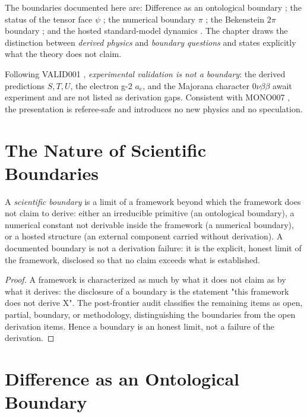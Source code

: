 The boundaries documented here are: Difference as an ontological boundary \cite{c13:QG278}; the
status of the tensor face $\psi$ \cite{c13:QG286}; the numerical boundary $\pi$ \cite{c13:QG291};
the Bekenstein $2\pi$ boundary \cite{c13:QG185,c13:QG196}; and the hosted standard-model dynamics
\cite{c13:QG242,c13:QG245}. The chapter draws the distinction between \emph{derived physics} and
\emph{boundary questions} \cite{c13:QG299} and states explicitly what the theory does not claim.

Following VALID001 \cite{c13:VALID001}, \emph{experimental validation is not a boundary}: the
derived predictions $S,T,U$, the electron g-2 $a_e$, and the Majorana character $0\nu\beta\beta$
await experiment and are not listed as derivation gaps. Consistent with MONO007 \cite{c13:MONO007},
the presentation is referee-safe and introduces no new physics and no speculation.

\section{The Nature of Scientific Boundaries}
\label{c13:sec:nature-boundaries}

\begin{lemma}
\label{c13:lem:boundaries-not-failures}
A \emph{scientific boundary} is a limit of a framework beyond which the framework does not
claim to derive: either an irreducible primitive (an ontological boundary), a numerical
constant not derivable inside the framework (a numerical boundary), or a hosted structure
(an external component carried without derivation). A documented boundary is not a
derivation failure: it is the explicit, honest limit of the framework, disclosed so that no
claim exceeds what is established.
\end{lemma}

\begin{proof}
A framework is characterized as much by what it does not claim as by what it derives: the
disclosure of a boundary is the statement "this framework does not derive X". The
post-frontier audit \cite{c13:QG299} classifies the remaining items as open, partial,
boundary, or methodology, distinguishing the boundaries from the open derivation items.
Hence a boundary is an honest limit, not a failure of the derivation.
\end{proof}

\section{Difference as an Ontological Boundary}
\label{c13:sec:difference-boundary}

